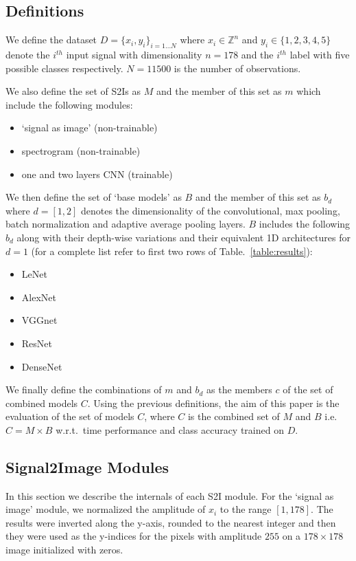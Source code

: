 \documentclass[conference]{IEEEtran}
\begin{document}
\subsection{Definitions}
We define the dataset $D=\{x_i, y_i\}_{i=1\ldots N}$ where $x_i \in \mathbb{Z}^n$ and $y_i \in \{1, 2, 3, 4, 5\}$ denote the $i^{th}$ input signal with dimensionality $n=178$ and the $i^{th}$ label with five possible classes respectively.
$N=11500$ is the number of observations.

We also define the set of S2Is as $M$ and the member of this set as $m$ which include the following modules:
\begin{itemize}
	\item `signal as image' (non-trainable)
	\item spectrogram (non-trainable)
	\item one and two layers CNN (trainable)
\end{itemize}

We then define the set of `base models' as $B$ and the member of this set as $b_d$ where $d=[1,2]$ denotes the dimensionality of the convolutional, max pooling, batch normalization and adaptive average pooling layers.
$B$ includes the following $b_d$ along with their depth-wise variations and their equivalent 1D architectures for $d=1$ (for a complete list refer to first two rows of Table.~\ref{table:results}):
\begin{itemize}
	\item LeNet~\cite{lecun1998gradient}
	\item AlexNet~\cite{krizhevsky2012imagenet}
	\item VGGnet~\cite{simonyan2014very}
	\item ResNet~\cite{he2016deep}
	\item DenseNet~\cite{huang2017densely}
\end{itemize}

We finally define the combinations of $m$ and $b_d$ as the members $c$ of the set of combined models $C$.
Using the previous definitions, the aim of this paper is the evaluation of the set of models $C$, where $C$ is the combined set of $M$ and $B$ i.e. $C=M\times B$ w.r.t.\ time performance and class accuracy trained on $D$.

\subsection{Signal2Image Modules}
In this section we describe the internals of each S2I module.
For the `signal as image' module, we normalized the amplitude of $x_i$ to the range $[1, 178]$.
The results were inverted along the y-axis, rounded to the nearest integer and then they were used as the y-indices for the pixels with amplitude $255$ on a $178\times 178$ image initialized with zeros.
\end{document}

